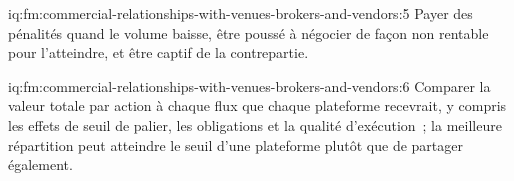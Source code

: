 \begin{solution}{iq:fm:commercial-relationships-with-venues-brokers-and-vendors:5}
Payer des pénalités quand le volume baisse, être poussé à négocier de façon non rentable pour l'atteindre, et être captif de la contrepartie.
\end{solution}

\begin{solution}{iq:fm:commercial-relationships-with-venues-brokers-and-vendors:6}
Comparer la valeur totale par action à chaque flux que chaque plateforme recevrait, y compris les effets de seuil de palier, les obligations et la qualité d'exécution~; la meilleure répartition peut
atteindre le seuil d'une plateforme plutôt que de partager également.
\end{solution}

